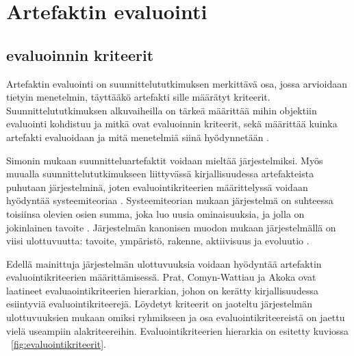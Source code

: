 \documentclass[utf8]{gradu3}
\begin{document}
\section{Artefaktin evaluointi}

\subsection{evaluoinnin kriteerit}
\label{kriteerit}

Artefaktin evaluointi on suunnittelututkimuksen merkittävä osa, jossa arvioidaan tietyin menetelmin, täyttääkö artefakti sille määrätyt kriteerit. Suunnittelututkimuksen alkuvaiheilla on tärkeä määrittää mihin objektiin evaluointi kohdistuu ja mitkä ovat evaluoinnin kriteerit, sekä määrittää kuinka artefakti evaluoidaan ja mitä menetelmiä siinä hyödynnetään \parencite[][]{evaluation}. 

Simonin \parencite[][]{simon1996} mukaan suunnitteluartefaktit voidaan mieltää järjestelmiksi. Myös muualla suunnittelututkimukseen liittyvässä kirjallisuudessa artefakteista puhutaan järjestelminä, joten evaluointikriteerien määrittelyssä voidaan hyödyntää systeemiteoriaa \parencite[][]{evaluation}. Systeemiteorian mukaan järjestelmä on suhteessa toisiinsa olevien osien summa, joka luo uusia ominaisuuksia, ja jolla on jokinlainen tavoite \parencite[][]{skyttner}. Järjestelmän kanonisen muodon mukaan järjestelmällä on viisi ulottuvuutta: tavoite, ympäristö, rakenne, aktiivisuus ja evoluutio \parencite[][]{modeling, systemic}.

Edellä mainittuja järjestelmän ulottuvuuksia voidaan hyödyntää artefaktin evaluointikriteerien määrittämisessä.  Prat, Comyn-Wattiau ja Akoka \parencite[][]{evaluation} ovat laatineet evaluaointikriteerien hierarkian, johon on kerätty kirjallisuudessa esiintyviä evaluointikriteerejä. Löydetyt kriteerit on jaoteltu järjestelmän ulottuvuuksien mukaan omiksi ryhmikseen ja osa evaluointikriteereistä on jaettu vielä useampiin alakriteereihin. Evaluointikriteerien hierarkia on esitetty kuviossa ~\ref{fig:evaluointikriteerit}.
\end{document}

